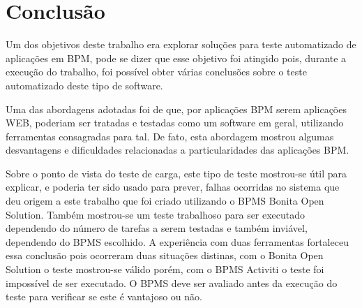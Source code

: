 \documentclass[12pt]{article}
\begin{document}

\section{Conclusão}
Um dos objetivos deste trabalho era explorar soluções para teste automatizado de aplicações em BPM, pode se dizer que esse objetivo foi atingido pois, durante a execução do trabalho, foi possível obter várias conclusões sobre o teste automatizado deste tipo de software.

Uma das abordagens adotadas foi de que, por aplicações BPM serem aplicações WEB, poderiam ser tratadas e testadas como um software em geral, utilizando ferramentas consagradas para tal. De fato, esta abordagem mostrou algumas desvantagens e dificuldades relacionadas a particularidades das aplicações BPM.

Sobre o ponto de vista do teste de carga, este tipo de teste mostrou-se útil para explicar, e poderia ter sido usado para prever, falhas ocorridas no sistema que deu origem a este trabalho que foi criado utilizando o BPMS Bonita Open Solution. Também mostrou-se um teste trabalhoso para ser executado dependendo do número de tarefas a serem testadas e também inviável, dependendo do BPMS escolhido. A experiência com duas ferramentas fortaleceu essa conclusão pois ocorreram duas situações distinas, com o Bonita Open Solution o teste mostrou-se válido porém, com o BPMS Activiti o teste foi impossível de ser executado. O BPMS deve ser avaliado antes da execução do teste para verificar se este é vantajoso ou não.
\end{document}

